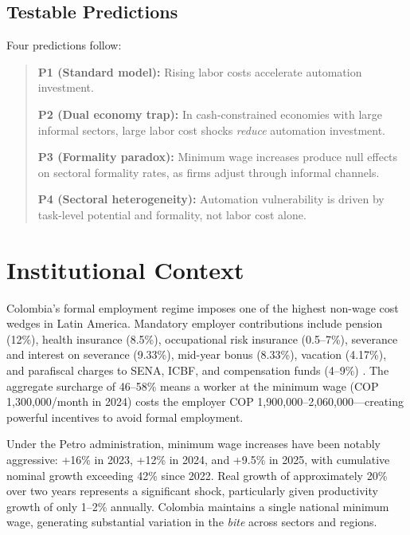 \documentclass[a4paper,fleqn]{cas-sc}
\begin{document}
\subsection{Testable Predictions}
\label{subsec:predictions}

Four predictions follow:
\begin{quote}
\textbf{P1 (Standard model):} Rising labor costs accelerate automation investment.

\textbf{P2 (Dual economy trap):} In cash-constrained economies with large informal sectors, large labor cost shocks \emph{reduce} automation investment.

\textbf{P3 (Formality paradox):} Minimum wage increases produce null effects on sectoral formality rates, as firms adjust through informal channels.

\textbf{P4 (Sectoral heterogeneity):} Automation vulnerability is driven by task-level potential and formality, not labor cost alone.
\end{quote}

\FloatBarrier


\section{Institutional Context}
\label{sec:context}

Colombia's formal employment regime imposes one of the highest non-wage cost wedges in Latin America. Mandatory employer contributions include pension (12\%), health insurance (8.5\%), occupational risk insurance (0.5--7\%), severance and interest on severance (9.33\%), mid-year bonus (8.33\%), vacation (4.17\%), and parafiscal charges to SENA, ICBF, and compensation funds (4--9\%) \citep{anif2018}. The aggregate surcharge of 46--58\% means a worker at the minimum wage (COP 1,300,000/month in 2024) costs the employer COP 1,900,000--2,060,000---creating powerful incentives to avoid formal employment.

Under the Petro administration, minimum wage increases have been notably aggressive: +16\% in 2023, +12\% in 2024, and +9.5\% in 2025, with cumulative nominal growth exceeding 42\% since 2022. Real growth of approximately 20\% over two years represents a significant shock, particularly given productivity growth of only 1--2\% annually. Colombia maintains a single national minimum wage, generating substantial variation in the \emph{bite} across sectors and regions.
\end{document}
